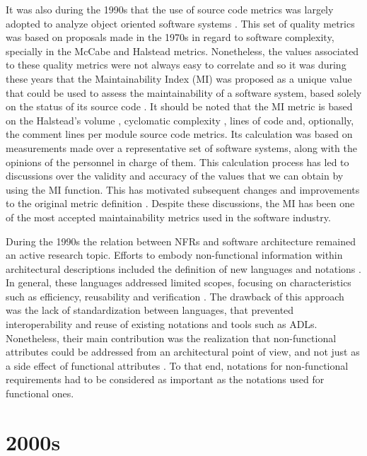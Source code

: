 \documentclass[10pt]{article}
\begin{document}
It was also during the 1990s that the use of source code metrics was largely adopted to analyze object oriented software systems \cite{Coleman94}. This set of quality metrics was based on proposals made in the 1970s in regard to software complexity, specially in the McCabe \cite{Honglei09} and Halstead \cite{Coleman94} metrics. Nonetheless, the values associated to these quality metrics were not always easy to correlate and so it was during these years that the Maintainability Index (MI) was proposed as a unique value that could be used to assess the maintainability of a software system, based solely on the status of its source code \cite{Heitlager07}. It should be noted that the MI metric is based on the Halstead’s volume \cite{Coleman94}, cyclomatic complexity \cite{Heitlager07}, lines of code \cite{Heitlager07} and, optionally, the comment lines per module \cite{Heitlager07} source code metrics. Its calculation was based on measurements made over a representative set of software systems, along with the opinions of the personnel in charge of them. This calculation process has led to discussions over the validity and accuracy of the values that we can obtain by using the MI function. This has motivated subsequent changes and improvements to the original metric definition \cite{Heitlager07}. Despite these discussions, the MI has been one of the most accepted maintainability metrics used in the software industry.

During the 1990s the relation between NFRs and software architecture remained an active research topic. Efforts to embody non-functional information within architectural descriptions included the definition of new languages and notations \cite{Franch98}. In general, these languages addressed limited scopes, focusing on characteristics such as efficiency, reusability and verification \cite{Franch98}. The drawback of this approach was the lack of standardization between languages, that prevented interoperability and reuse of existing notations and tools such as ADLs. Nonetheless, their main contribution was the realization that non-functional attributes could be addressed from an architectural point of view, and not just as a side effect of functional attributes \cite{Franch98}. To that end, notations for non-functional requirements had to be considered as important as the notations used for functional ones.



\section{2000s}
\end{document}
